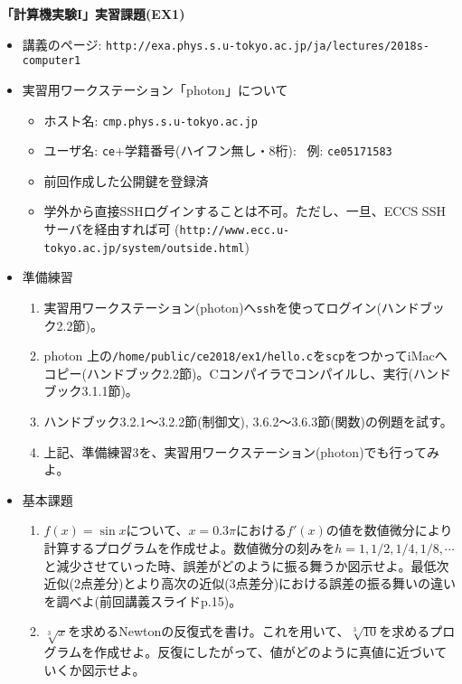 \documentclass[11pt]{jarticle}
\begin{document}
\noindent
{\bf\large 「計算機実験I」実習課題(EX1)}
\\[-0.5em]

\noindent
\begin{itemize}
\item 講義のページ: \verb+http://exa.phys.s.u-tokyo.ac.jp/ja/lectures/2018s-computer1+

\item 実習用ワークステーション「photon」について
  \begin{itemize}
  \item ホスト名: {\tt cmp.phys.s.u-tokyo.ac.jp}
  \item ユーザ名: {\tt ce}+学籍番号(ハイフン無し・8桁): \ 例: {\tt ce05171583}
  \item 前回作成した公開鍵を登録済
  \item 学外から直接SSHログインすることは不可。ただし、一旦、ECCS SSHサーバを経由すれば可 (\verb+http://www.ecc.u-tokyo.ac.jp/system/outside.html+)
  \end{itemize}
  
\item 準備練習
  \begin{enumerate}
  \item 実習用ワークステーション(photon)へ{\tt ssh}を使ってログイン(ハンドブック2.2節)。
  \item photon 上の{\tt /home/public/ce2018/ex1/hello.c}を{\tt scp}をつかってiMacへコピー(ハンドブック2.2節)。Cコンパイラでコンパイルし、実行(ハンドブック3.1.1節)。
  \item ハンドブック3.2.1〜3.2.2節(制御文), 3.6.2〜3.6.3節(関数)の例題を試す。
  \item 上記、準備練習3を、実習用ワークステーション(photon)でも行ってみよ。
  \end{enumerate}

\item 基本課題
  \begin{enumerate}
  \item $f(x)=\sin x$について、$x=0.3\pi$における$f'(x)$の値を数値微分により計算するプログラムを作成せよ。数値微分の刻みを$h=1,1/2,1/4,1/8,\cdots$と減少させていった時、誤差がどのように振る舞うか図示せよ。最低次近似(2点差分)とより高次の近似(3点差分)における誤差の振る舞いの違いを調べよ(前回講義スライドp.15)。
  \item $\sqrt[3]{x}$を求めるNewtonの反復式を書け。これを用いて、$\sqrt[3]{10}$を求めるプログラムを作成せよ。反復にしたがって、値がどのように真値に近づいていくか図示せよ。
  \end{enumerate}
  

\end{itemize}
\end{document}
